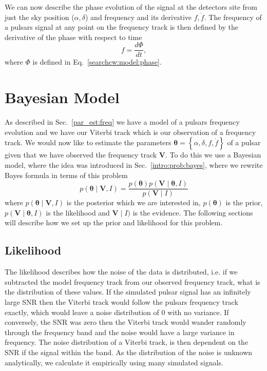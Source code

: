 We can now describe the phase evolution of the signal at the detectors site from just the sky position ($\alpha, \delta$) and frequency and its derivative $f,\dot{f}$. 
The frequency of a pulsars signal at any point on the frequency track is then defined by the derivative of the phase with respect to time
\begin{equation}
    f = \frac{d\Phi}{dt}, 
\end{equation}
where $\Phi$ is defined in Eq.~\ref{searchcw:model:phase}.

%
%
\section{\label{par_est:bayes}Bayesian Model}
%
%

As described in Sec.~\ref{par_est:freq} we have a model of a pulsars frequency evolution and we have our Viterbi track which is our observation of a frequency track.
We would now like to estimate the parameters $\bm{\theta} = \left\{\alpha, \delta, f, \dot{f} \right\}$ of a pulsar given that we have observed the frequency track $\bm{V}$.
To do this we use a Bayesian model, where the idea was introduced in Sec.~\ref{intro:prob:bayes}, where we rewrite Bayes formula in terms of this problem
\begin{equation}
    \label{par_est:bayes:eqn}
    p(\bm{\theta} \mid \bm{V}, I) = \frac{p(\bm{\theta}) p(\bm{V} \mid \bm{\theta}, I)}{p(\bm{V} \mid I)}
\end{equation}
where $p(\bm{\theta} \mid \bm{V}, I)$ is the posterior which we are interested in, $p(\bm{\theta})$ is the prior, $p(\bm{V} \mid \bm{\theta}, I)$ is the likelihood and $\bm{V} \mid I)$ is the evidence.
The following sections will describe how we set up the prior and likelihood for this problem.

%
%
\subsection{\label{par_est:bayes:likelihood}Likelihood}
%
%

The likelihood describes how the noise of the data is distributed, i.e. if we subtracted the model frequency track from our observed frequency track, what is the distribution of these values.
If the simulated pulsar signal has an infinitely large \gls{SNR} then the Viterbi track would follow the pulsars frequency track exactly, which would leave a noise distribution of 0 with no variance. 
If conversely, the \gls{SNR} was zero then the Viterbi track would wander randomly through the frequency band and the noise would have a large variance in frequency.
The noise distribution of a Viterbi track, is then dependent on the \gls{SNR} if the signal within the band.
As the distribution of the noise is unknown analytically, we calculate it empirically using many simulated signals.

